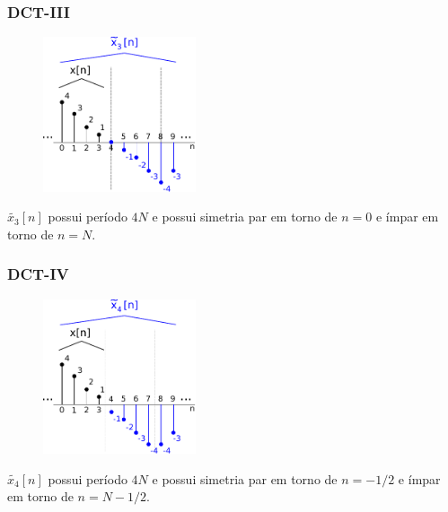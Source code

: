 \begin{frame}%
  \frametitle{DCT-III}
    \vspace{-0.2cm}
    \begin{figure}[ht]
    \centering
    \includegraphics[width=0.4\textwidth]{images/dct-3-ex.pdf}
    \label{fig:DCT-III}
    \end{figure}
    $\tilde{x_3}[n]$ possui período $4N$ e possui simetria par em torno de $n=0$ e ímpar em torno de $n=N$.
\end{frame}

\begin{frame}%
  \frametitle{DCT-IV}
    \vspace{-0.2cm}
    \begin{figure}[ht]
    \centering
    \includegraphics[width=0.4\textwidth]{images/dct-4-ex.pdf}
    \label{fig:DCT-IV}
    \end{figure}
    $\tilde{x_4}[n]$ possui período $4N$ e possui simetria par em torno de $n=-1/2$ e ímpar em torno de $n=N-1/2$.
\end{frame}


